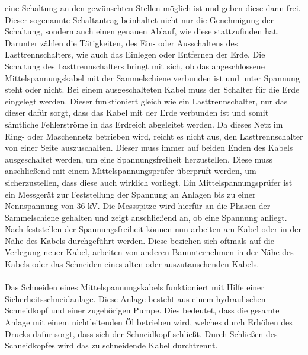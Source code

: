 eine Schaltung an den gewünschten Stellen möglich ist und geben diese dann frei. Dieser sogenannte Schaltantrag beinhaltet nicht nur die Genehmigung der 
Schaltung, sondern auch einen genauen Ablauf, wie diese stattzufinden hat. Darunter zählen die Tätigkeiten, des Ein- oder Ausschaltens des Lasttrennschalters, 
wie auch das Einlegen oder Entfernen der Erde. Die Schaltung des Lasttrennschalters bringt mit sich, ob das angeschlossene Mittelspannungskabel mit der 
Sammelschiene verbunden ist und unter Spannung steht oder nicht. Bei einem ausgeschalteten Kabel muss der Schalter für die Erde eingelegt werden. Dieser 
funktioniert gleich wie ein Lasttrennschalter, nur das dieser dafür sorgt, dass das Kabel mit der Erde verbunden ist und somit sämtliche Fehlerströme in das 
Erdreich abgeleitet werden. Da dieses Netz im Ring- oder Maschennetz betrieben wird, reicht es nicht aus, den Lasttrennschalter von einer Seite auszuschalten. 
Dieser muss immer auf beiden Enden des Kabels ausgeschaltet werden, um eine Spannungsfreiheit herzustellen. Diese muss anschließend mit einem 
Mittelspannungsprüfer überprüft werden, um sicherzustellen, dass diese auch wirklich vorliegt. Ein Mittelspannungsprüfer ist ein Messgerät zur 
Feststellung der Spannung an Anlagen bis zu einer Nennspannung von 36 kV. Die Messspitze wird hierfür an die Phasen der Sammelschiene gehalten und 
zeigt anschließend an, ob eine Spannung anliegt. \autocite{Pfisterer.}
\\
Nach feststellen der Spannungsfreiheit können nun arbeiten am Kabel oder in der Nähe des Kabels durchgeführt werden. Diese beziehen sich oftmals auf die 
Verlegung neuer Kabel, arbeiten von anderen Bauunternehmen in der Nähe des Kabels oder das Schneiden eines alten oder auszutauschenden Kabels.
\\\\
Das Schneiden eines Mittelspannungskabels funktioniert mit Hilfe einer Sicherheitsschneidanlage. Diese Anlage besteht aus einem hydraulischen Schneidkopf 
und einer zugehörigen Pumpe. Dies bedeutet, dass die gesamte Anlage mit einem nichtleitenden Öl betrieben wird, welches durch Erhöhen des Drucks dafür sorgt, 
dass sich der Schneidkopf schließt. Durch Schließen des Schneidkopfes wird das zu schneidende Kabel durchtrennt.
